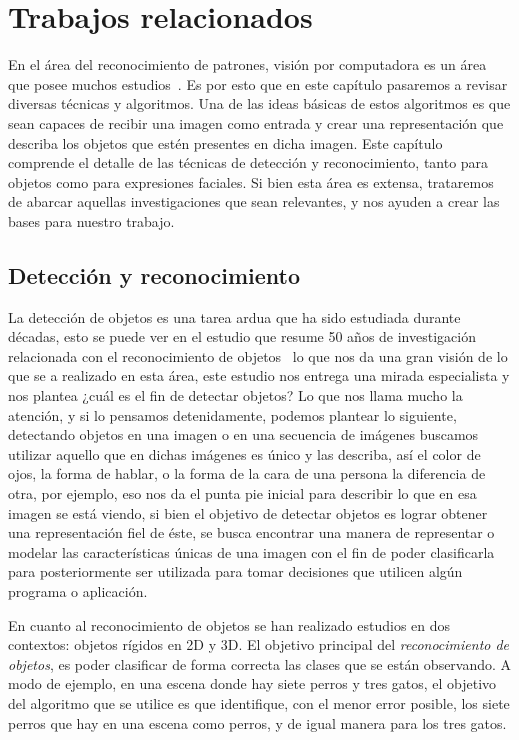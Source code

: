 \chapter[Trabajos relacionados ]{Trabajos relacionados }\label{ch:capitulo2}

En el área del reconocimiento de patrones, visión por computadora es un área que posee muchos estudios~\cite{Andreopoulos2013}. Es por esto que en este capítulo pasaremos a revisar diversas técnicas y algoritmos. Una de las ideas básicas de estos algoritmos es que sean capaces de recibir una imagen como entrada y crear una representación que describa los objetos que estén presentes en dicha imagen. Este capítulo comprende el detalle de las técnicas de detección y reconocimiento, tanto para objetos como para expresiones faciales. Si bien esta área es extensa, trataremos de abarcar aquellas investigaciones que sean relevantes, y nos ayuden a crear las bases para nuestro trabajo.

\section{Detección y reconocimiento}
La detección de objetos es una tarea ardua que ha sido estudiada durante décadas, esto se puede ver en el estudio que resume 50 años de investigación relacionada con el reconocimiento de objetos~\cite{Andreopoulos2013} lo que nos da una gran visión de lo que se a realizado en esta área, este estudio nos entrega una mirada especialista y nos plantea ¿cuál es el fin de detectar objetos? Lo que nos llama mucho la atención, y si lo pensamos detenidamente, podemos plantear lo siguiente, detectando objetos en una imagen o en una secuencia de imágenes buscamos utilizar aquello que en dichas imágenes es único y las describa, así el color de ojos, la forma de hablar, o la forma de la cara de una persona la diferencia de otra, por ejemplo, eso nos da el punta pie inicial para describir lo que en esa imagen se está viendo, si bien el objetivo de detectar objetos es lograr obtener una representación fiel de éste, se busca encontrar una manera de representar o modelar las características únicas de una imagen con el fin de poder clasificarla para posteriormente ser utilizada para tomar decisiones que utilicen algún programa o aplicación.

En cuanto al reconocimiento de objetos se han realizado estudios en dos contextos: objetos rígidos en 2D y 3D\@. El objetivo principal del \textit{reconocimiento de objetos}, es poder clasificar de forma correcta las clases que se están observando. A modo de ejemplo, en una escena donde hay siete perros y tres gatos, el objetivo del algoritmo que se utilice es que identifique, con el menor error posible, los siete perros que hay en una escena como perros, y de igual manera para los tres gatos.

